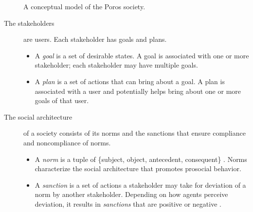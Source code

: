 \documentclass[11pt,          %
               phd,           %
               onehalfspacing %
               ]{ncsuthesis}
\newcommand{\frameworkB}{Poros\xspace}
\begin{document}
\begin{figure}[!htb]
{
}
\caption{A conceptual model of the \frameworkB society.}
\label{fig:precious-model} \end{figure}

\begin{description}
\item[The stakeholders] are users. Each stakeholder has goals and plans.

\begin{itemize}[nosep]
  \item A \emph{goal} is a set of desirable states. A goal is
    associated with one or more stakeholder; each stakeholder may have multiple
    goals.
  \item A \emph{plan} is a set of actions that can bring about a goal.
    A plan is associated with a user and potentially helps bring about 
    one or more goals of that user.
\end{itemize}

\item[The social architecture] of a society consists of its norms
and the sanctions that ensure compliance and noncompliance of norms.

\begin{itemize}[nosep]
  \item A \emph{norm} is a tuple of \{subject, object, antecedent, consequent\} \citep{Singh-2013-Norms}. 
    Norms  characterize the social architecture that promotes prosocial behavior. 
  \item A \emph{sanction} is a set of actions a stakeholder may take
    for deviation of a norm by another stakeholder.  Depending on how
    agents perceive deviation, it results in \emph{sanctions} that are
    positive or negative \citep{Nardin-KER16-Classifying}.
\end{itemize}


\end{description}
\end{document}
